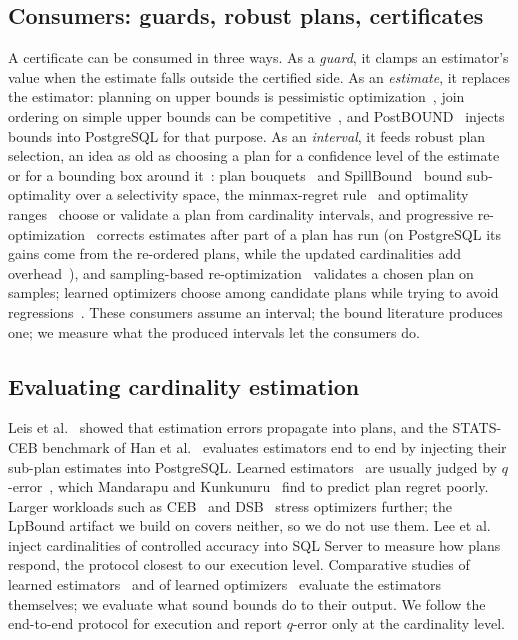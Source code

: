 \documentclass[sigconf, nonacm]{acmart}
\begin{document}
\subsection{Consumers: guards, robust plans, certificates}
A certificate can be consumed in three ways. As a \emph{guard}, it clamps an
estimator's value when the estimate falls outside the certified side. As an
\emph{estimate}, it replaces the estimator: planning on upper bounds is
pessimistic optimization~\cite{cai2019pessimistic}, join ordering on simple
upper bounds can be competitive~\cite{hertzschuch2021simplicity}, and
PostBOUND~\cite{bergmann2023postbound} injects bounds into PostgreSQL for
that purpose. As an \emph{interval}, it feeds robust plan selection, an idea as old as
choosing a plan for a confidence level of the estimate~\cite{babcock2005robust}
or for a bounding box around it~\cite{babu2005proactive}: plan
bouquets~\cite{dutt2016bouquets} and SpillBound~\cite{karthik2016spillbound}
bound sub-optimality over a selectivity space, the minmax-regret
rule~\cite{alyoubi2015minmax} and optimality ranges~\cite{wolf2018optimality}
choose or validate a plan from cardinality intervals, and progressive
re-optimization~\cite{markl2004pop,perron2019reopt} corrects estimates after
part of a plan has run (on PostgreSQL its gains come from the re-ordered plans,
while the updated cardinalities add overhead~\cite{mu2025aqp}), and sampling-based
re-optimization~\cite{wu2016sampling} validates a chosen plan on samples;
learned optimizers choose among candidate plans while trying to avoid
regressions~\cite{doshi2023kepler,zhu2023lero}. These consumers assume an interval; the bound literature
produces one; we measure what the produced intervals let the consumers do.

\subsection{Evaluating cardinality estimation}
Leis et al.~\cite{leis2015good,leis2018looking} showed that estimation errors
propagate into plans, and the STATS-CEB benchmark of Han et al.~\cite{han2021cardest}
evaluates estimators end to end by injecting their sub-plan estimates into
PostgreSQL. Learned estimators~\cite{kipf2019learned,yang2021neurocard,%
hilprecht2020deepdb,hertzschuch2021flat,wu2021bayescard,wu2023factorjoin} are
usually judged by $q$-error~\cite{moerkotte2009preventing}, which Mandarapu
and Kunkunuru~\cite{mandarapu2026regimes} find to predict plan regret poorly.
Larger workloads such as CEB~\cite{negi2021flowloss} and
DSB~\cite{ding2021dsb} stress optimizers further; the LpBound artifact we
build on covers neither, so we do not use them. Lee et
al.~\cite{lee2023analyzing} inject cardinalities of controlled accuracy into SQL
Server to measure how plans respond, the protocol closest to our execution
level. Comparative studies of learned
estimators~\cite{wang2021ready,sun2021design,kim2022learned,chronis2024cardbench}
and of learned
optimizers~\cite{lehmann2024learned} evaluate the estimators themselves; we
evaluate what sound bounds do to their output. We follow the end-to-end
protocol for execution and report $q$-error only at the cardinality level.
\end{document}
